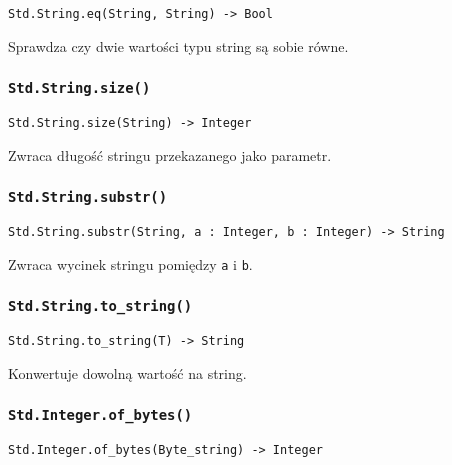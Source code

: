 \begin{small}
\begin{lstlisting}
Std.String.eq(String, String) -> Bool
\end{lstlisting}
\end{small}

Sprawdza czy dwie wartości typu string są sobie równe.

\subsubsection{\texttt{Std.String.size()}}

\begin{small}
\begin{lstlisting}
Std.String.size(String) -> Integer
\end{lstlisting}
\end{small}

Zwraca długość stringu przekazanego jako parametr.

\subsubsection{\texttt{Std.String.substr()}}

\begin{small}
\begin{lstlisting}
Std.String.substr(String, a : Integer, b : Integer) -> String
\end{lstlisting}
\end{small}

Zwraca wycinek stringu pomiędzy \texttt{a} i \texttt{b}.

\subsubsection{\texttt{Std.String.to\_string()}}

\begin{small}
\begin{lstlisting}
Std.String.to_string(T) -> String
\end{lstlisting}
\end{small}

Konwertuje dowolną wartość na string.

\subsubsection{\texttt{Std.Integer.of\_bytes()}}

\begin{small}
\begin{lstlisting}
Std.Integer.of_bytes(Byte_string) -> Integer
\end{lstlisting}
\end{small}

